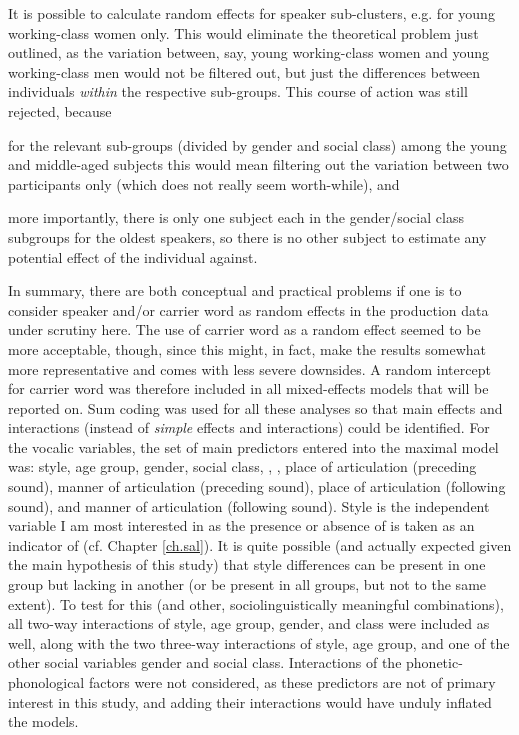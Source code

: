 It is possible to calculate random effects for speaker sub-clusters, e.g. for young working-class women only.
This would eliminate the theoretical problem just outlined, as the variation between, say, young working-class women and young working-class men would not be filtered out, but just the differences between individuals \emph{within} the respective sub-groups.
This course of action was still rejected, because
	\begin{inparaenum}[(a)]
		\item for the relevant sub-groups (divided by gender and social class) among the young and middle-aged subjects this would mean filtering out the variation between two participants only (which does not really seem worth-while), and
		\item more importantly, there is only one subject each in the gender/social class subgroups for the oldest speakers, so there is no other subject to estimate any potential effect of the individual against.		
	\end{inparaenum}

In summary, there are both conceptual and practical problems if one is to consider speaker and/or carrier word as random effects in the production data under scrutiny here.
The use of carrier word as a random effect seemed to be more acceptable, though, since this might, in fact, make the results somewhat more representative and comes with less severe downsides.
A random intercept for carrier word was therefore included in all mixed-effects models that will be reported on.
Sum coding was used for all these analyses so that main effects and interactions (instead of \emph{simple} effects and interactions) could be identified.
For the vocalic variables, the set of main predictors entered into the maximal model was: style, age group, gender, social class, , , place of articulation (preceding sound), manner of articulation (preceding sound), place of articulation (following sound), and manner of articulation (following sound).
Style is the independent variable I am most interested in as the presence or absence of  is taken as an indicator of  (cf. Chapter \ref{ch.sal}).
It is quite possible (and actually expected given the main hypothesis of this study) that style differences can be present in one group but lacking in another (or be present in all groups, but not to the same extent).
To test for this (and other, sociolinguistically meaningful combinations), all two-way interactions of style, age group, gender, and class were included as well, along with the two three-way interactions of style, age group, and one of the other social variables gender and social class.
Interactions of the phonetic-phonological factors were not considered, as these predictors are not of primary interest in this study, and adding their interactions would have unduly inflated the models.

